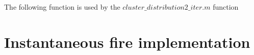 \documentclass[11pt]{article}
\begin{document}
\begin{appendix}
The following function is used by the $cluster\_distribution2\_iter.m$ function





\section{Instantaneous fire implementation}








\end{appendix}
\end{document}
